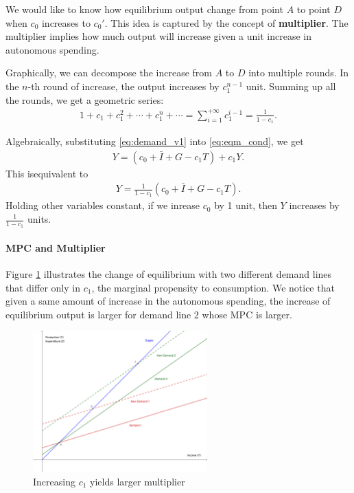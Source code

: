 \documentclass[12pt]{article}
\begin{document}
We would like to know how equilibrium output change from point $A$ to point $D$ when $c_0$ increases to $c_0'$. This idea is captured by the concept of \textbf{multiplier}. The multiplier implies how much output will increase given a unit increase in autonomous spending. 

Graphically, we can decompose the increase from $A$ to $D$ into multiple rounds. In the $n$-th round of increase, the output increases by $c_1^{n-1}$ unit. Summing up all the rounds, we get a geometric series:
\begin{align*}
    1 + c_1 + c_1^2 + \cdots + c_1^n + \cdots = \sum_{i=1}^{+\infty} c_1^{i-1} = \frac{1}{1-c_1}.
\end{align*}

Algebraically, substituting \eqref{eq:demand_v1} into \eqref{eq:eqm_cond}, we get
\begin{align*}
    Y = (c_0 + \bar{I} + G - c_1T) + c_1Y.
\end{align*}
This isequivalent to
\begin{align*}
    Y = \frac{1}{1-c_1} (c_0 + \bar{I} + G - c_1T).
\end{align*}
Holding other variables constant, if we inrease $c_0$ by 1 unit, then $Y$ increases by $\frac{1}{1-c_1}$ units.

\paragraph{MPC and Multiplier}
Figure \ref{fig:key_cross_v3} illustrates the change of equilibrium with two different demand lines that differ only in $c_1$, the marginal propensity to consumption. We notice that given a same amount of increase in the autonomous spending, the increase of equilibrium output is larger for demand line 2 whose MPC is larger.

\begin{figure}[htp]
    \centering
    \includegraphics[width=0.6\textwidth]{keynesian_cross_c1change.png}
    \caption{Increasing $c_1$ yields larger multiplier}
    \label{fig:key_cross_v3}
\end{figure}
\end{document}
